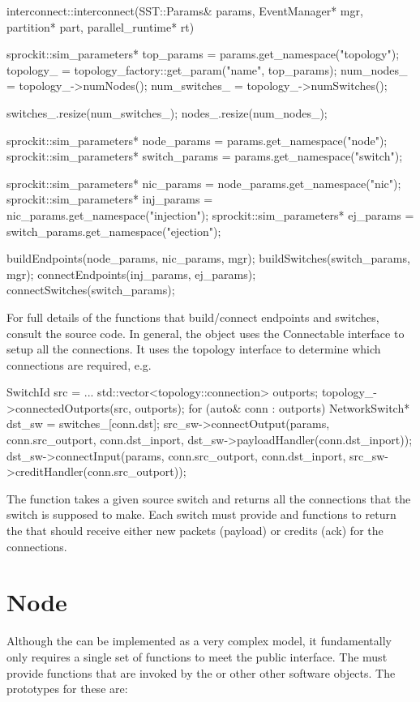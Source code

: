 \begin{CppCode}
interconnect::interconnect(SST::Params& params, EventManager* mgr, 
	partition* part, parallel_runtime* rt)
{
  sprockit::sim_parameters* top_params = params.get_namespace("topology");
  topology_ = topology_factory::get_param("name", top_params);
  num_nodes_ = topology_->numNodes();
  num_switches_ = topology_->numSwitches();
  
  switches_.resize(num_switches_);
  nodes_.resize(num_nodes_);

  sprockit::sim_parameters* node_params = params.get_namespace("node");
  sprockit::sim_parameters* switch_params = params.get_namespace("switch");
  
  sprockit::sim_parameters* nic_params = node_params.get_namespace("nic");
  sprockit::sim_parameters* inj_params = nic_params.get_namespace("injection");
  sprockit::sim_parameters* ej_params = switch_params.get_namespace("ejection"); 
  
  buildEndpoints(node_params, nic_params, mgr);
  buildSwitches(switch_params, mgr);
  connectEndpoints(inj_params, ej_params);
  connectSwitches(switch_params); 
}
\end{CppCode}

For full details of the functions that build/connect endpoints and switches, consult the source code.
In general, the  object uses the Connectable interface to setup all the connections.
It uses the topology interface to determine which connections are required, e.g.

\begin{CppCode}
SwitchId src = ...
std::vector<topology::connection> outports;
topology_->connectedOutports(src, outports);
for (auto& conn : outports){
  NetworkSwitch* dst_sw = switches_[conn.dst];
  src_sw->connectOutput(params, conn.src_outport, conn.dst_inport,
  					 dst_sw->payloadHandler(conn.dst_inport));
  dst_sw->connectInput(params, conn.src_outport, conn.dst_inport,
  				       src_sw->creditHandler(conn.src_outport));
}
\end{CppCode}
The  function takes a given source switch and returns all the connections that the
switch is supposed to make.  Each switch must provide  and  functions to return
the  that should receive either new packets (payload) or credits (ack) for the connections.

\section{Node}\label{sec:node}
Although the \nodecls can be implemented as a very complex model, it fundamentally only requires a single set of functions to meet the public interface.
The \nodecls must provide  functions that are invoked by the  or other other software objects.
The prototypes for these are:


